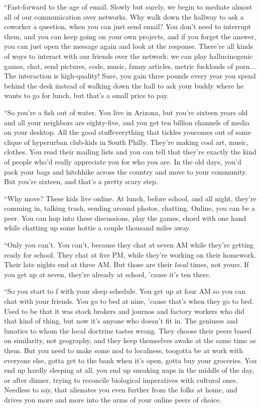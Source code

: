 “Fast-forward to the age of email. Slowly but surely, we begin to
mediate almost all of our communication over networks. Why walk
down the hallway to ask a coworker a question, when you can just
send email? You don’t need to interrupt them, and you can keep
going on your own projects, and if you forget the answer, you can
just open the message again and look at the response. There’re all
kinds of ways to interact with our friends over the network: we can
play hallucinogenic games, chat, send pictures, code, music, funny
articles, metric fuckloads of porn... The interaction is
high-quality! Sure, you gain three pounds every year you spend
behind the desk instead of walking down the hall to ask your buddy
where he wants to go for lunch, but that’s a small price to pay.

“So you’re a fish out of water. You live in Arizona, but you’re
sixteen years old and all your neighbors are eighty-five, and you
get ten billion channels of media on your desktop. All the good
stuff{\dash}everything that tickles you{\dash}comes out of some clique of
hyperurban club-kids in South Philly. They’re making cool art,
music, clothes. You read their mailing lists and you can tell that
they’re exactly the kind of people who’d really appreciate you for
who you are. In the old days, you’d pack your bags and hitchhike
across the country and move to your community. But you’re sixteen,
and that’s a pretty scary step.

“Why move? These kids live online. At lunch, before school, and all
night, they’re comming in, talking trash, sending around photos,
chatting. Online, you can be a peer. You can hop into these
discussions, play the games, chord with one hand while chatting up
some hottie a couple thousand miles away.

“Only you can’t. You can’t, because they chat at seven AM while
they’re getting ready for school. They chat at five PM, while
they’re working on their homework. Their late nights end at three
AM. But those are their \emph{local} times, not yours. If you get
up at seven, they’re already at school, ’cause it’s ten there.

“So you start to f with your sleep schedule. You get up at four AM
so you can chat with your friends. You go to bed at nine, ’cause
that’s when they go to bed. Used to be that it was stock brokers
and journos and factory workers who did that kind of thing, but now
it’s anyone who doesn’t fit in. The geniuses and lunatics to whom
the local doctrine tastes wrong. They choose their peers based on
similarity, not geography, and they keep themselves awake at the
same time as them. But you need to make some nod to localness,
too{\dash}gotta be at work with everyone else, gotta get to the bank when
it’s open, gotta buy your groceries. You end up hardly sleeping at
all, you end up sneaking naps in the middle of the day, or after
dinner, trying to reconcile biological imperatives with cultural
ones. Needless to say, that alienates you even further from the
folks at home, and drives you more and more into the arms of your
online peers of choice.

